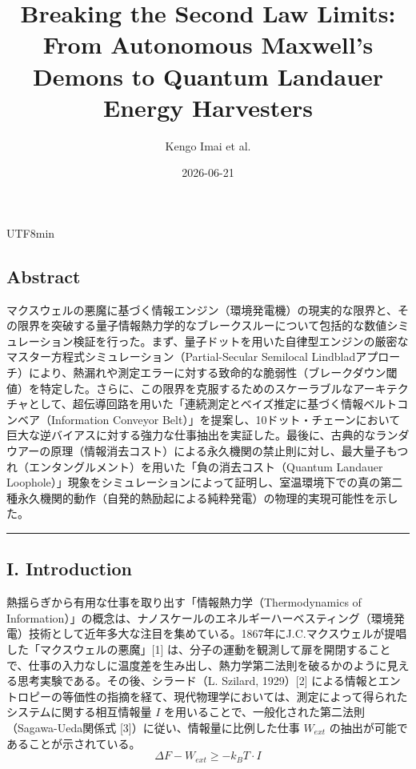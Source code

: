 \documentclass[a4paper,11pt,twocolumn]{article}
\title{Breaking the Second Law Limits: From Autonomous Maxwell's Demons to Quantum Landauer Energy Harvesters}
\author{Kengo Imai et al.}
\date{2026-06-21}
\begin{document}
\begin{CJK*}{UTF8}{min}


\subsection{Abstract}
マクスウェルの悪魔に基づく情報エンジン（環境発電機）の現実的な限界と、その限界を突破する量子情報熱力学的なブレークスルーについて包括的な数値シミュレーション検証を行った。まず、量子ドットを用いた自律型エンジンの厳密なマスター方程式シミュレーション（Partial-Secular Semilocal Lindbladアプローチ）により、熱漏れや測定エラーに対する致命的な脆弱性（ブレークダウン閾値）を特定した。さらに、この限界を克服するためのスケーラブルなアーキテクチャとして、超伝導回路を用いた「連続測定とベイズ推定に基づく情報ベルトコンベア（Information Conveyor Belt）」を提案し、10ドット・チェーンにおいて巨大な逆バイアスに対する強力な仕事抽出を実証した。最後に、古典的なランダウアーの原理（情報消去コスト）による永久機関の禁止則に対し、最大量子もつれ（エンタングルメント）を用いた「負の消去コスト（Quantum Landauer Loophole）」現象をシミュレーションによって証明し、室温環境下での真の第二種永久機関的動作（自発的熱励起による純粋発電）の物理的実現可能性を示した。

\vspace{1em}\hrule\vspace{1em}

\subsection{I. Introduction}
熱揺らぎから有用な仕事を取り出す「情報熱力学（Thermodynamics of Information）」の概念は、ナノスケールのエネルギーハーベスティング（環境発電）技術として近年多大な注目を集めている。1867年にJ.C.マクスウェルが提唱した「マクスウェルの悪魔」[1] は、分子の運動を観測して扉を開閉することで、仕事の入力なしに温度差を生み出し、熱力学第二法則を破るかのように見える思考実験である。その後、シラード（L. Szilard, 1929）[2] による情報とエントロピーの等価性の指摘を経て、現代物理学においては、測定によって得られたシステムに関する相互情報量 $I$ を用いることで、一般化された第二法則（Sagawa-Ueda関係式 [3]）に従い、情報量に比例した仕事 $W_{ext}$ の抽出が可能であることが示されている。
\begin{equation} \Delta F - W_{ext} \geq -k_B T \cdot I \end{equation}


\end{CJK*}
\end{document}
